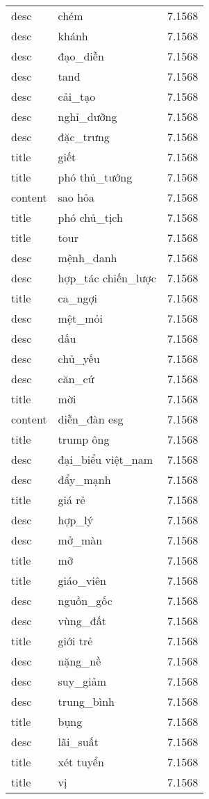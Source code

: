 \documentclass{article}
\begin{document}
\begin{tabular}{lll}
desc & chém & 7.1568\\
desc & khánh & 7.1568\\
desc & đạo\_diễn & 7.1568\\
desc & tand & 7.1568\\
desc & cải\_tạo & 7.1568\\
desc & nghỉ\_dưỡng & 7.1568\\
desc & đặc\_trưng & 7.1568\\
title & giết & 7.1568\\
title & phó thủ\_tướng & 7.1568\\
content & sao hỏa & 7.1568\\
title & phó chủ\_tịch & 7.1568\\
title & tour & 7.1568\\
desc & mệnh\_danh & 7.1568\\
desc & hợp\_tác chiến\_lược & 7.1568\\
title & ca\_ngợi & 7.1568\\
desc & mệt\_mỏi & 7.1568\\
desc & dấu & 7.1568\\
desc & chủ\_yếu & 7.1568\\
desc & căn\_cứ & 7.1568\\
title & mời & 7.1568\\
content & diễn\_đàn esg & 7.1568\\
title & trump ông & 7.1568\\
desc & đại\_biểu việt\_nam & 7.1568\\
desc & đẩy\_mạnh & 7.1568\\
title & giá rẻ & 7.1568\\
desc & hợp\_lý & 7.1568\\
desc & mở\_màn & 7.1568\\
title & mỡ & 7.1568\\
title & giáo\_viên & 7.1568\\
desc & nguồn\_gốc & 7.1568\\
desc & vùng\_đất & 7.1568\\
title & giới trẻ & 7.1568\\
desc & nặng\_nề & 7.1568\\
desc & suy\_giảm & 7.1568\\
desc & trung\_bình & 7.1568\\
title & bụng & 7.1568\\
desc & lãi\_suất & 7.1568\\
title & xét tuyển & 7.1568\\
title & vị & 7.1568\\

\end{tabular}
\end{document}

